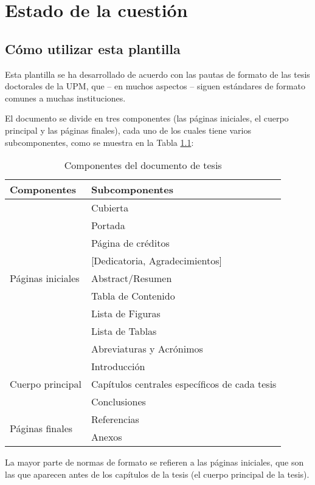 %
\chapter{Estado de la cuestión}
\label{ch::capitulo2}

\section{Cómo utilizar esta plantilla}
Esta plantilla se ha desarrollado de acuerdo con las pautas de formato de las tesis doctorales de la UPM, que – en muchos aspectos – siguen estándares de formato comunes a muchas instituciones.

El documento se divide en tres componentes (las páginas iniciales, el cuerpo principal y las páginas finales), cada uno de los cuales tiene varios subcomponentes, como se muestra en la Tabla \ref{tab:thesisComp}:

\begin{table}[h]
\centering
    \caption{Componentes del documento de tesis}
    \label{tab:thesisComp}
\begin{tabularx}{\textwidth}{l l}
\toprule
\textbf{Componentes} & \textbf{Subcomponentes}\\
\midrule
\multirow{9}{10em}{Páginas iniciales} & Cubierta \\ 
 & Portada \\
  & Página de créditos \\
  & [Dedicatoria, Agradecimientos] \\
    & Abstract/Resumen \\
     & Tabla de Contenido \\
     & Lista de Figuras \\
     & Lista de Tablas \\
     & Abreviaturas y Acrónimos \\
\midrule 
\multirow{3}{10em}{Cuerpo principal} & Introducción \\ 
 & Capítulos centrales específicos de cada tesis \\
 & Conclusiones \\
\midrule
\multirow{2}{10em}{Páginas finales} & Referencias \\ 
     & Anexos\\
\bottomrule
    \end{tabularx}
\end{table}

La mayor parte de normas de formato se refieren a las páginas iniciales, que son las que aparecen antes de los capítulos de la tesis (el cuerpo principal de la tesis).

